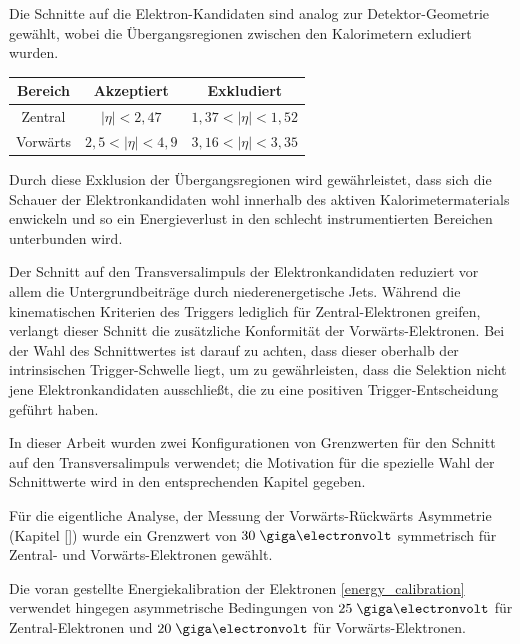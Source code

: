 \begin{description}
        Die Schnitte auf die Elektron-Kandidaten sind analog zur
        Detektor-Geometrie gewählt, wobei die Übergangsregionen zwischen den
        Kalorimetern exludiert wurden.
        \begin{table}[h!]
            \centering
            \begin{tabular}{|c|c|c|}
                \hline
                \bf{Bereich} & \bf{Akzeptiert} & \bf{Exkludiert} \\
                \hline \hline
                Zentral  & $|\eta| < 2,47$      & $1,37 < |\eta| < 1,52$ \\
                Vorwärts & $2,5 < |\eta| < 4,9$ & $3,16 < |\eta| < 3,35$ \\
                \hline
            \end{tabular}
        \end{table}

        Durch diese Exklusion der Übergangsregionen wird gewährleistet, dass
        sich die Schauer der Elektronkandidaten wohl innerhalb des aktiven
        Kalorimetermaterials enwickeln und so ein Energieverlust in den
        schlecht instrumentierten Bereichen unterbunden wird.


        Der Schnitt auf den Transversalimpuls der Elektronkandidaten reduziert
        vor allem die Untergrundbeiträge durch niederenergetische Jets. Während
        die kinematischen Kriterien des Triggers lediglich für
        Zentral-Elektronen greifen, verlangt dieser Schnitt die zusätzliche
        Konformität der Vorwärts-Elektronen. Bei der Wahl des Schnittwertes ist
        darauf zu achten, dass dieser oberhalb der intrinsischen
        Trigger-Schwelle liegt, um zu gewährleisten, dass die Selektion nicht
        jene Elektronkandidaten ausschließt, die zu eine positiven
        Trigger-Entscheidung geführt haben.

        In dieser Arbeit wurden zwei Konfigurationen von Grenzwerten für den
        Schnitt auf den Transversalimpuls verwendet; die Motivation für die
        spezielle Wahl der Schnittwerte wird in den entsprechenden Kapitel
        gegeben.

        Für die eigentliche Analyse, der Messung der Vorwärts-Rückwärts
        Asymmetrie (Kapitel \ref{})
        wurde ein Grenzwert von \emph{$30\GeV$} symmetrisch für Zentral- und
        Vorwärts-Elektronen gewählt.

        Die voran gestellte Energiekalibration der Elektronen
        \ref{energy_calibration} verwendet hingegen asymmetrische Bedingungen
        von \emph{$25\GeV$} für Zentral-Elektronen und \emph{$20\GeV$} für
        Vorwärts-Elektronen.

\end{description}



